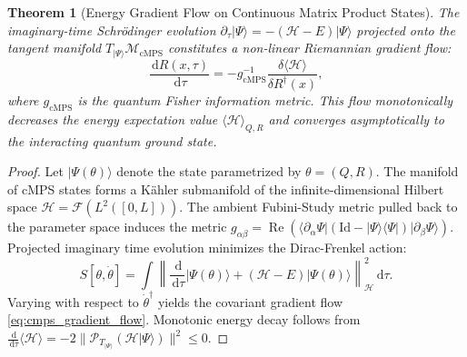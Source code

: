 \documentclass[11pt,a4paper,reqno]{amsart}
\newtheorem{theorem}{Theorem}[section]
\theoremstyle{definition}
\numberwithin{equation}{section}
\newcommand{\Id}{\mathrm{Id}}
\newcommand{\dif}{\,\mathrm{d}}
\begin{document}
\begin{theorem}[Energy Gradient Flow on Continuous Matrix Product States]
\label{thm:cmps_energy_flow}
The imaginary-time Schr\"odinger evolution $\partial_\tau |\Psi\rangle = -(\mathcal{H} - E) |\Psi\rangle$ projected onto the tangent manifold $T_{|\Psi\rangle}\mathcal{M}_{\mathrm{cMPS}}$ constitutes a non-linear Riemannian gradient flow:
\begin{equation}
    \label{eq:cmps_gradient_flow}
    \frac{\dif R(x, \tau)}{\dif \tau} = -g_{\mathrm{cMPS}}^{-1} \frac{\delta \langle \mathcal{H} \rangle}{\delta R^\dagger(x)},
\end{equation}
where $g_{\mathrm{cMPS}}$ is the quantum Fisher information metric. This flow monotonically decreases the energy expectation value $\langle \mathcal{H} \rangle_{Q, R}$ and converges asymptotically to the interacting quantum ground state.
\end{theorem}
\begin{proof}
Let $|\Psi(\theta)\rangle$ denote the state parametrized by $\theta = (Q, R)$. The manifold of cMPS states forms a K\"ahler submanifold of the infinite-dimensional Hilbert space $\mathscr{H} = \mathcal{F}(L^2([0, L]))$. The ambient Fubini-Study metric pulled back to the parameter space induces the metric $g_{\alpha \beta} = \operatorname{Re}\left( \langle \partial_\alpha \Psi | (\Id - |\Psi\rangle \langle \Psi|) | \partial_\beta \Psi \rangle \right)$. Projected imaginary time evolution minimizes the Dirac-Frenkel action:
\begin{equation}
    S[\theta, \dot{\theta}] = \int \left\| \frac{\dif}{\dif \tau} |\Psi(\theta)\rangle + (\mathcal{H} - E) |\Psi(\theta)\rangle \right\|_{\mathscr{H}}^2 \dif \tau.
\end{equation}
Varying with respect to $\dot{\theta}^\dagger$ yields the covariant gradient flow \eqref{eq:cmps_gradient_flow}. Monotonic energy decay follows from $\frac{\dif}{\dif \tau}\langle \mathcal{H} \rangle = -2 \| \mathcal{P}_{T_{|\Psi\rangle}}(\mathcal{H} |\Psi\rangle) \|^2 \le 0$.
\end{proof}
\end{document}
